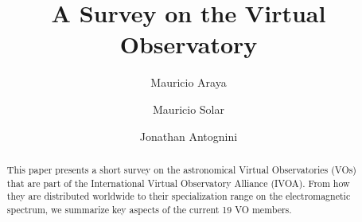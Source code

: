 \documentclass[preprint]{elsarticle}
\begin{document}
\title{A Survey on the Virtual Observatory}

\author[utfsm]{Mauricio Araya}


\author[utfsm]{Mauricio Solar}


\author[utfsm]{Jonathan Antognini}


\address[utfsm]{Universidad T\'ecnica Federico Santa Mar\'ia\\
Avenida Espa\~na 1680, Valpara\'iso, Chile}

\begin{abstract}
This paper presents a short survey on the astronomical Virtual Observatories (VOs) that are 
part of the International Virtual Observatory Alliance (IVOA). From how they are
distributed worldwide to their specialization range on the electromagnetic spectrum, 
we summarize key aspects of the current 19 VO members. 
\end{abstract}

\maketitle




















%



\end{document}
